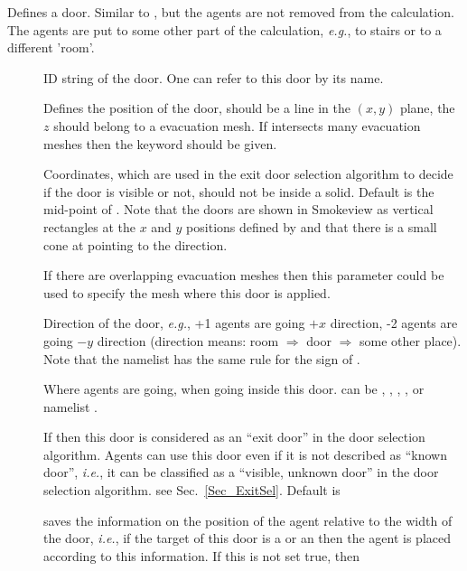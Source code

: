 \documentclass[12pt,a4paper,final,twoside]{stylevk}
\begin{document}
\noindent Defines a door.  Similar to , but the agents are
not removed from the calculation.  The agents are put to some other
part of the calculation, \emph{e.g.}, to stairs or to a different
'room'.

\begin{description}
%
\item[] ID string of the door. One can refer to this door by
  its name.
%
\item[] Defines the position of the door, should be a line
  in the $(x,y)$ plane, the $z$ should belong to a evacuation mesh.
  If  intersects many evacuation meshes then the keyword
   should be given. 
%
\item[] Coordinates, which are used in the exit door
  selection algorithm to decide if the door is visible or not, should
  not be inside a solid.  Default is the mid-point of .
  Note that the doors are shown in Smokeview as vertical rectangles at
  the $x$ and $y$ positions defined by  and that there is a
  small cone at  pointing to the  direction.
%
\item[] If there are overlapping evacuation meshes
  then this parameter could be used to specify the mesh where this
  door is applied.
%
\item[] Direction of the door, \emph{e.g.}, +1 agents are
  going $+x$ direction, -2 agents are going $-y$ direction (direction
  means: room $\Rightarrow$ door $\Rightarrow$ some other place).
  Note that the namelist  has the same rule for the sign
  of .
%
\item[] Where agents are going, when going inside this
  door.   can be , ,
  , , or  namelist .
%
\item[] If  then this door is
  considered as an ``exit door'' in the door selection algorithm.
  Agents can use this door even if it is not described as ``known
  door'', \emph{i.e.}, it can be classified as a ``visible, unknown
  door'' in the door selection algorithm. see Sec.~\ref{Sec_ExitSel}.
  Default is 
%
\item[] saves the information on the position of the
  agent relative to the width of the door, \emph{i.e.}, if the target
  of this door is a  or an  then the agent is
  placed according to this information.  If this is not set true, then

\end{description}
\end{document}
